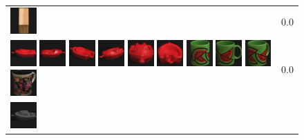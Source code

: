 {\begin{figure}[p]
\begin{tabular}{m{11cm} | m{3cm} |}
\includegraphics[width=1cm]{coil/beeld-47.eps}
& {\scriptsize 0.0}
\\
\includegraphics[width=1cm]{coil/beeld-18.eps}
\includegraphics[width=1cm]{coil/beeld-19.eps}
\includegraphics[width=1cm]{coil/beeld-22.eps}
\includegraphics[width=1cm]{coil/beeld-21.eps}
\includegraphics[width=1cm]{coil/beeld-20.eps}
\includegraphics[width=1cm]{coil/beeld-23.eps}
\includegraphics[width=1cm]{coil/beeld-32.eps}
\includegraphics[width=1cm]{coil/beeld-30.eps}
\includegraphics[width=1cm]{coil/beeld-33.eps}
\includegraphics[width=1cm]{coil/beeld-63.eps}
& {\scriptsize 0.0}
\\
\includegraphics[width=1cm]{coil/beeld-24.eps}

\end{tabular}
\end{figure}}
